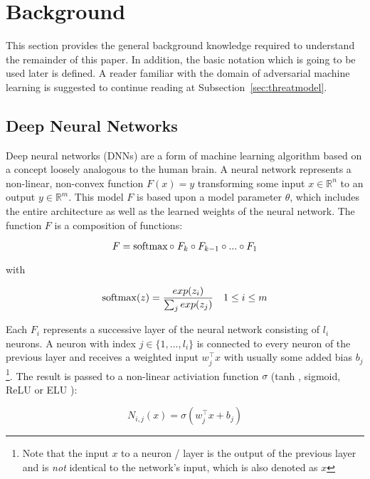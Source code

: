 
\section{Background}\label{sec:background}

This section provides the general background knowledge required to understand the remainder of this paper.
In addition, the basic notation which is going to be used later is defined.
A reader familiar with the domain of adversarial machine learning is suggested to continue reading at Subsection~\ref{sec:threatmodel}.

\subsection{Deep Neural Networks}\label{subsec:dnn}
Deep neural networks (DNNs) are a form of machine learning algorithm based on a concept loosely analogous to the human brain.
A neural network represents a non-linear, non-convex function $F(x) = y$ transforming some input $x \in \mathbb{R}^n$ to an output $y \in \mathbb{R}^m$.
This model $F$ is based upon a model parameter $\theta$, which includes the entire architecture as well as the learned weights of the neural network. 
The function $F$ is a composition of functions:

\begin{equation*}
F = \operatorname{softmax} \circ\; F_k \circ F_{k-1} \circ ... \circ F_1
\end{equation*}

with

\begin{align*}
\operatorname{softmax}(z) = \frac{exp(z_i)}{\sum_j exp(z_j)} && 1 \leq i \leq m
\end{align*}

Each $F_i$ represents a successive layer of the neural network consisting of $l_i$ neurons. A neuron with index $j \in \{1,...,l_i\}$ is connected to every neuron of the previous layer and receives a weighted input $w_j^\top x$ with usually some added bias $b_j$\footnote{Note that the input $x$ to a neuron / layer is the output of the previous layer and is \emph{not} identical to the network's input, which is also denoted as $x$}. The result is passed to a non-linear activiation function $\sigma$ (tanh \cite{tanh}, sigmoid, ReLU \cite{relu} or ELU \cite{elu}):

\begin{equation*}
N_{i,j}(x) = \sigma(w_j^\top x + b_j)
\end{equation*}

